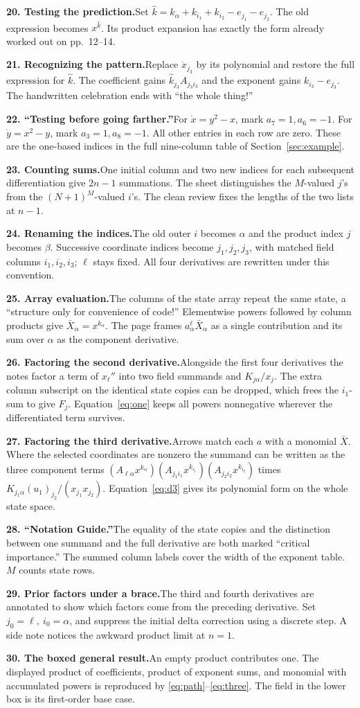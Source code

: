 \documentclass[11pt,letterpaper]{article}
\newcommand{\leaf}[2]{\par\smallskip\begingroup\interlinepenalty=10000\noindent\textbf{#1}\enspace #2\par\endgroup}
\begin{document}
\leaf{20. Testing the prediction.}{Set
\(\hat k=k_\alpha+k_{i_1}+k_{i_2}-e_{j_1}-e_{j_2}\).
The old expression becomes \(x^{\hat k}\). Its product expansion has exactly
the form already worked out on pp.~12--14.}
\leaf{21. Recognizing the pattern.}{Replace \(\dot x_{j_3}\) by its
polynomial and restore the full expression for \(\hat k\). The coefficient
gains \(\hat k_{j_3}A_{j_3 i_3}\) and the exponent gains
\(k_{i_3}-e_{j_3}\). The handwritten celebration ends with “the whole thing!”}
\leaf{22. “Testing before going farther.”}{For \(\dot x=y^2-x\), mark
\(a_7=1,a_6=-1\). For \(\dot y=x^2-y\), mark \(a_3=1,a_8=-1\).
All other entries in each row are zero. These are the one-based indices
in the full nine-column table of Section~\ref{sec:example}.}
\leaf{23. Counting sums.}{One initial column and two new indices for each
subsequent differentiation give \(2n-1\) summations. The sheet distinguishes
the \(M\)-valued \(j\)'s from the \((N+1)^M\)-valued \(i\)'s. The clean
review fixes the lengths of the two lists at \(n-1\).}
\leaf{24. Renaming the indices.}{The old outer \(i\) becomes \(\alpha\) and
the product index \(j\) becomes \(\beta\). Successive coordinate indices
become \(j_1,j_2,j_3\), with matched field columns \(i_1,i_2,i_3\);
\(\ell\) stays fixed. All four derivatives are rewritten under this convention.}
\leaf{25. Array evaluation.}{The columns of the state array repeat the same
state, a “structure only for convenience of code!” Elementwise powers followed
by column products give \(\bar X_\alpha=x^{k_\alpha}\). The page frames
\(a^\ell_\alpha\bar X_\alpha\) as a single contribution and its sum over
\(\alpha\) as the component derivative.}
\leaf{26. Factoring the second derivative.}{Alongside the first four
derivatives the notes factor a term of \(x_\ell''\) into two field summands and
\(K_{j\alpha}/x_j\). The extra column subscript on the identical state copies
can be dropped, which frees the \(i_1\)-sum to give \(F_j\).
Equation~\eqref{eq:one} keeps all powers nonnegative wherever the
differentiated term survives.}
\leaf{27. Factoring the third derivative.}{Arrows match each \(a\) with
a monomial \(\bar X\). Where the selected coordinates are nonzero the
summand can be written as the three component terms
\((A_{\ell\alpha}x^{k_\alpha})(A_{j_1i_1}x^{k_{i_1}})
 (A_{j_2i_2}x^{k_{i_2}})\)
times \(K_{j_1\alpha}(u_1)_{j_2}/(x_{j_1}x_{j_2})\).
Equation~\eqref{eq:d3} gives its polynomial form on the whole state space.}
\leaf{28. “Notation Guide.”}{The equality of the state copies and the
distinction between one summand and the full derivative are both marked
“critical importance.” The summed column labels cover the width of the
exponent table. \(M\) counts state rows.}
\leaf{29. Prior factors under a brace.}{The third and fourth derivatives
are annotated to show which factors come from the preceding derivative.
Set \(j_0=\ell,\ i_0=\alpha\), and suppress the initial delta correction
using a discrete step. A side note notices the awkward product limit at
\(n=1\).}
\leaf{30. The boxed general result.}{An empty product contributes one.
The displayed product of coefficients, product of exponent sums, and
monomial with accumulated powers is reproduced by
\eqref{eq:path}--\eqref{eq:three}. The field in the lower box is its
first-order base case.}
\end{document}
